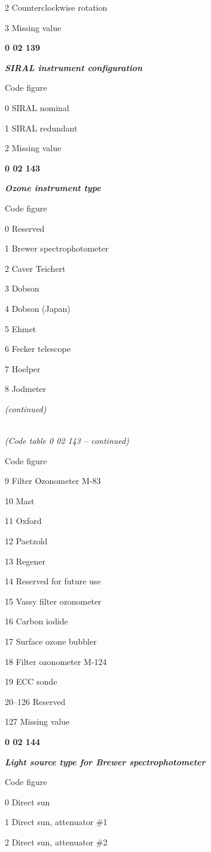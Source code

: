 2 Counterclockwise rotation

3 Missing value

\textbf{0 02 139}

\emph{\textbf{SIRAL instrument configuration}}

Code figure

0 SIRAL nominal

1 SIRAL redundant

2 Missing value

\textbf{0 02 143}

\emph{\textbf{Ozone instrument type}}

Code figure

0 Reserved

1 Brewer spectrophotometer

2 Caver Teichert

3 Dobson

4 Dobson (Japan)

5 Ehmet

6 Fecker telescope

7 Hoelper

8 Jodmeter

\emph{(continued)}

\emph{\\
} \emph{(Code table 0 02 143 -- continued)}

Code figure

9 Filter Ozonometer M-83

10 Mast

11 Oxford

12 Paetzold

13 Regener

14 Reserved for future use

15 Vassy filter ozonometer

16 Carbon iodide

17 Surface ozone bubbler

18 Filter ozonometer M-124

19 ECC sonde

20--126 Reserved

127 Missing value

\textbf{0 02 144}

\emph{\textbf{Light source type for Brewer spectrophotometer}}

Code figure

0 Direct sun

1 Direct sun, attenuator \#1

2 Direct sun, attenuator \#2

